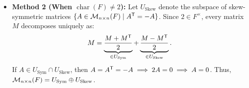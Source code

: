 \begin{exercisesolution*}
\begin{enumerate}[label=\textbf{(\alph*)}]
\begin{itemize}
        \item \textbf{Method 2 (When $\operatorname{char}(F) \ne 2$):}
        Let $U_{\mathrm{Skew}}$ denote the subspace of skew-symmetric matrices $\{A \in \mathcal{M}_{n \times n}(F) \mid A^{\mathsf{T}} = -A\}$.
        Since $2 \in F^\times$, every matrix $M$ decomposes uniquely as:
        \[
        M = \underbrace{\frac{M + M^{\mathsf{T}}}{2}}_{\in U_{\mathrm{Sym}}} + \underbrace{\frac{M - M^{\mathsf{T}}}{2}}_{\in U_{\mathrm{Skew}}}.
        \]
        If $A \in U_{\mathrm{Sym}} \cap U_{\mathrm{Skew}}$, then $A = A^{\mathsf{T}} = -A \implies 2A = 0 \implies A = 0$. Thus, $\mathcal{M}_{n \times n}(F) = U_{\mathrm{Sym}} \oplus U_{\mathrm{Skew}}$.
    \end{itemize}
\end{enumerate}
\end{exercisesolution*}
